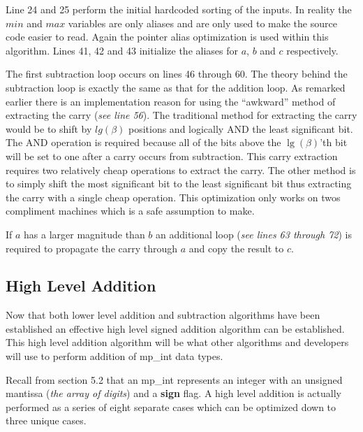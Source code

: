 \documentclass[b5paper]{book}
\begin{document}
Line 24 and 25 perform the initial hardcoded sorting of the inputs.  In reality the $min$ and $max$ variables are only aliases and are only 
used to make the source code easier to read.  Again the pointer alias optimization is used within this algorithm.  Lines 41, 42 and 43 initialize the aliases for 
$a$, $b$ and $c$ respectively.

The first subtraction loop occurs on lines 46 through 60.  The theory behind the subtraction loop is exactly the same as that for
the addition loop.  As remarked earlier there is an implementation reason for using the ``awkward'' method of extracting the carry 
(\textit{see line 56}).  The traditional method for extracting the carry would be to shift by $lg(\beta)$ positions and logically AND 
the least significant bit.  The AND operation is required because all of the bits above the $\lg(\beta)$'th bit will be set to one after a carry
occurs from subtraction.  This carry extraction requires two relatively cheap operations to extract the carry.  The other method is to simply 
shift the most significant bit to the least significant bit thus extracting the carry with a single cheap operation.  This optimization only works on
twos compliment machines which is a safe assumption to make.

If $a$ has a larger magnitude than $b$ an additional loop (\textit{see lines 63 through 72}) is required to propagate the carry through
$a$ and copy the result to $c$.  

\subsection{High Level Addition}
Now that both lower level addition and subtraction algorithms have been established an effective high level signed addition algorithm can be
established.  This high level addition algorithm will be what other algorithms and developers will use to perform addition of mp\_int data 
types.  

Recall from section 5.2 that an mp\_int represents an integer with an unsigned mantissa (\textit{the array of digits}) and a \textbf{sign} 
flag.  A high level addition is actually performed as a series of eight separate cases which can be optimized down to three unique cases.
\end{document}
